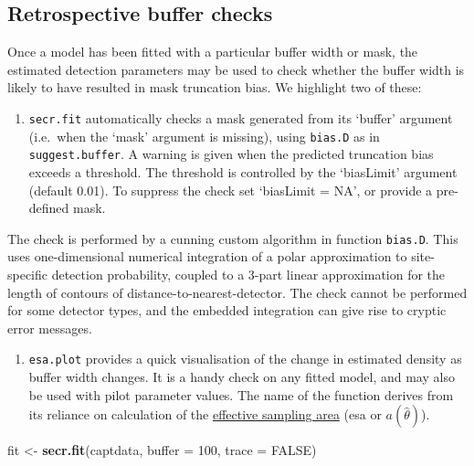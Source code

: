 \documentclass[
]{book}
\newenvironment{Shaded}{\begin{snugshade}}{\end{snugshade}}
\newcommand{\AttributeTok}[1]{\textcolor[rgb]{0.13,0.29,0.53}{#1}}
\newcommand{\ConstantTok}[1]{\textcolor[rgb]{0.56,0.35,0.01}{#1}}
\newcommand{\DecValTok}[1]{\textcolor[rgb]{0.00,0.00,0.81}{#1}}
\newcommand{\FunctionTok}[1]{\textcolor[rgb]{0.13,0.29,0.53}{\textbf{#1}}}
\newcommand{\NormalTok}[1]{#1}
\newcommand{\OtherTok}[1]{\textcolor[rgb]{0.56,0.35,0.01}{#1}}
\providecommand{\tightlist}{%
  \setlength{\itemsep}{0pt}\setlength{\parskip}{0pt}}
\begin{document}
\subsection{Retrospective buffer checks}\label{suggest}

Once a model has been fitted with a particular buffer width or mask, the estimated detection parameters may be used to check whether the buffer width is likely to have resulted in mask truncation bias. We highlight two of these:


\begin{enumerate}
\def\labelenumi{\arabic{enumi}.}
\tightlist
\item
  \texttt{secr.fit} automatically checks a mask generated from its `buffer' argument (i.e.~when the `mask' argument is missing), using \texttt{bias.D} as in \texttt{suggest.buffer}. A warning is given when the predicted truncation bias exceeds a threshold. The threshold is controlled by the `biasLimit' argument (default 0.01). To suppress the check set `biasLimit = NA', or provide a pre-defined mask.
\end{enumerate}

The check is performed by a cunning custom algorithm in function \texttt{bias.D}. This uses one-dimensional numerical integration of a polar approximation to site-specific detection probability, coupled to a 3-part linear approximation for the length of contours of distance-to-nearest-detector. The check cannot be performed for some detector types, and the embedded integration can give rise to cryptic error messages.


\begin{enumerate}
\def\labelenumi{\arabic{enumi}.}
\setcounter{enumi}{1}
\tightlist
\item
  \texttt{esa.plot} provides a quick visualisation of the change in estimated density as buffer width changes. It is a handy
  check on any fitted model, and may also be used with pilot parameter values. The name of the function derives from its reliance on calculation of the \hyperref[esa]{effective sampling area} (esa or \(a(\hat \theta)\)).
\end{enumerate}

\begin{Shaded}
\begin{Highlighting}[]
\NormalTok{fit }\OtherTok{\textless{}{-}} \FunctionTok{secr.fit}\NormalTok{(captdata, }\AttributeTok{buffer =} \DecValTok{100}\NormalTok{, }\AttributeTok{trace =} \ConstantTok{FALSE}\NormalTok{)}
\end{Highlighting}
\end{Shaded}
\end{document}
